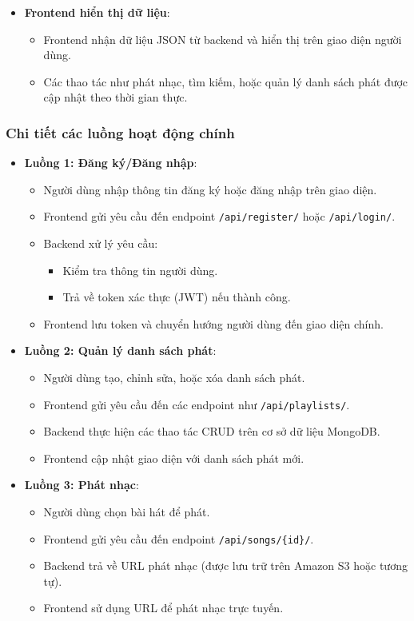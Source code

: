 \begin{itemize}
    \item \textbf{Frontend hiển thị dữ liệu}:
    \begin{itemize}
        \item Frontend nhận dữ liệu JSON từ backend và hiển thị trên giao diện người dùng.
        \item Các thao tác như phát nhạc, tìm kiếm, hoặc quản lý danh sách phát được cập nhật theo thời gian thực.
    \end{itemize}
\end{itemize}

\subsubsection{Chi tiết các luồng hoạt động chính}
\begin{itemize}
    \item \textbf{Luồng 1: Đăng ký/Đăng nhập}:
    \begin{itemize}
        \item Người dùng nhập thông tin đăng ký hoặc đăng nhập trên giao diện.
        \item Frontend gửi yêu cầu đến endpoint \texttt{/api/register/} hoặc \texttt{/api/login/}.
        \item Backend xử lý yêu cầu:
        \begin{itemize}
            \item Kiểm tra thông tin người dùng.
            \item Trả về token xác thực (JWT) nếu thành công.
        \end{itemize}
        \item Frontend lưu token và chuyển hướng người dùng đến giao diện chính.
    \end{itemize}

    \item \textbf{Luồng 2: Quản lý danh sách phát}:
    \begin{itemize}
        \item Người dùng tạo, chỉnh sửa, hoặc xóa danh sách phát.
        \item Frontend gửi yêu cầu đến các endpoint như \texttt{/api/playlists/}.
        \item Backend thực hiện các thao tác CRUD trên cơ sở dữ liệu MongoDB.
        \item Frontend cập nhật giao diện với danh sách phát mới.
    \end{itemize}

    \item \textbf{Luồng 3: Phát nhạc}:
    \begin{itemize}
        \item Người dùng chọn bài hát để phát.
        \item Frontend gửi yêu cầu đến endpoint \texttt{/api/songs/\{id\}/}.
        \item Backend trả về URL phát nhạc (được lưu trữ trên Amazon S3 hoặc tương tự).
        \item Frontend sử dụng URL để phát nhạc trực tuyến.
    \end{itemize}


\end{itemize}
